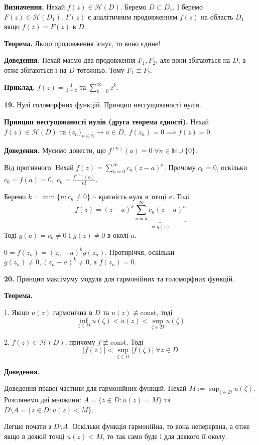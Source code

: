 \documentclass[14pt]{extarticle}
\begin{document}
\textbf{Визначення.} Нехай $f(z) \in \mathcal{H}(D)$. Беремо $D \subset D_1$. І беремо $F(z) \in \mathcal{H}(D_1)$.  $F(z)$ є аналітичним продовженням $f(z)$ на область $D_1$ якщо $f(z) = F(z)$ в $D$.

\textbf{Теорема.} Якщо продовження існує, то воно єдине!

\textbf{Доведення.} Нехай маємо два продовження $F_1,F_2$, але вони збігаються на $D$, а отже збігаються і на $D$ тотожньо. Тому $F_1 \equiv F_2$.

\textbf{Приклад.} $f(z)=\frac{1}{1-z}$ та $\sum_{k=0}^{\infty}z^k$. 

\textbf{19.} Нулі голоморфних функцій. Принцип несгущованості нулів.

\textbf{Принцип несгущованості нулів (друга теорема єдності).} Нехай $f(z) \in \mathcal{H}(D)$ та $\{z_n\}_{n \in \mathbb{N}} \xrightarrow[]{} a \in D, \; f(z_n) = 0 \implies f(z) = 0$.

\textbf{Доведення.} Мусимо довести, що $f^{(n)}(a) = 0 \; \forall n \in \mathbb{N} \cup \{0\}$. 

Від противного. Нехай $f(z) = \sum_{n=0}^{\infty}c_n(z-a)^n$. Причому $c_0=0$, оскільки $c_0=f(a)=0, \; c_n = \frac{f^{(n)}(a)}{n!}$. 

Беремо $k=\min \{n: c_n \neq 0\}$ -- кратність нуля в точці $a$. Тоді
\[
f(z) = (z-a)^k\underbrace{\sum_{n=k}^{\infty}c_n(z-a)^n}_{=g(z)}
\]
Тоді $g(a) = c_k \neq 0$ і $g(z) \neq 0$ в околі $a$. 

$0 = f(z_n) = (z_n-a)^kg(z_n)$. Протиріччя, оскільки $g(z_n) \neq 0, (z_n-a)^k \neq 0$, а $f(z_n)=0$. 

\textbf{20.} Принцип максімуму модуля для гармонійних та голоморфних функцій.

\textbf{Теорема.} 

1. Якщо $u(z)$ гармонічна в $D$ та $u(z) \not\equiv \text{const}$, тоді
\[
\inf_{\zeta \in D} u(\zeta) < u(z) < \sup_{\zeta \in D} u(\zeta)
\]

2. $f(z) \in \mathcal{H}(D)$, причому $f \not\equiv \text{const}$. Тоді
\[
|f(z)| < \sup_{\zeta \in D}|f(\zeta)| \; \forall z \in D
\]

\textbf{Доведення.} 

Доведення правої частини для гармонійних функцій. Нехай $M:=\sup_{\zeta \in D}u(\zeta)$. Розглянемо дві множини: $A = \{z \in D: u(z) = M\}$ та $D \setminus A=\{z \in D: u(z) < M\}$.

Легше почати з $D \setminus A$. Оскільки функція гармонійна, то вона неперервна, а отже якщо в деякій точці $u(z)<M$, то так само буде і для деякого її околу. 
\end{document}
